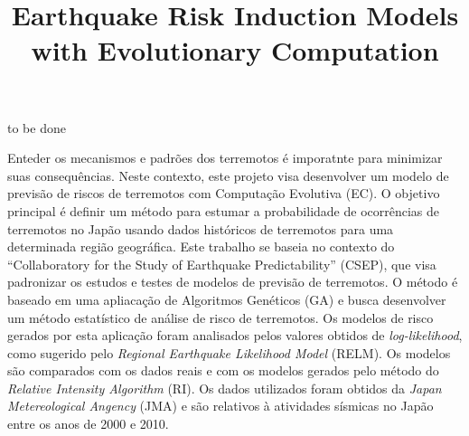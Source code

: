 \documentclass[bacharelado]{unb-cic}
\title{Earthquake Risk Induction Models with Evolutionary Computation}
\begin{document}
  \maketitle
  \pretextual

  \begin{agradecimentos}
  to be done
  \end{agradecimentos}
  \begin{resumo}
  Enteder os mecanismos e padrões dos terremotos é imporatnte para minimizar suas consequências. Neste contexto, este projeto visa desenvolver um modelo de previsão de riscos de terremotos com Computação Evolutiva (EC). O objetivo principal é definir um método para estumar a probabilidade de ocorrências de terremotos no Japão usando dados históricos de terremotos para uma determinada região geográfica. Este trabalho se baseia no contexto do  “Collaboratory for the Study of Earthquake Predictability” (CSEP), que visa padronizar os estudos e testes de modelos de previsão de terremotos. O método é baseado em uma apliacação de Algoritmos Genéticos (GA) e busca desenvolver um método estatístico de análise de risco de terremotos. Os modelos de risco gerados por esta aplicação foram analisados pelos valores obtidos de {\it log-likelihood}, como sugerido pelo {\it Regional Earthquake Likelihood Model} (RELM). Os modelos são comparados com os dados reais e com os modelos gerados pelo método do {\it Relative Intensity Algorithm} (RI). Os dados utilizados foram obtidos da {\it Japan Metereological Angency} (JMA) e são relativos à atividades sísmicas no Japão entre os anos de 2000 e 2010.
  \end{resumo}
\end{document}
